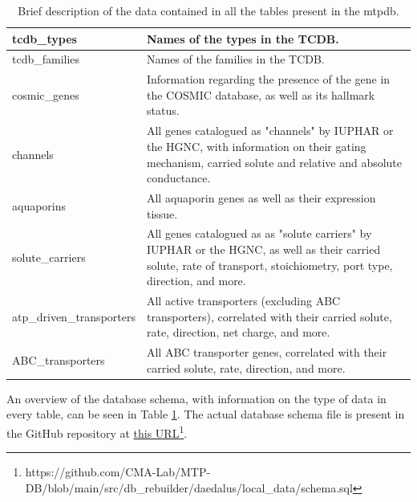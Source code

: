 \begin{table}
\begin{tabularx}{\textwidth}{|l|X|}
tcdb\_types               & Names of the types in the TCDB.                                                                                                                                     \\ \hline
tcdb\_families            & Names of the families in the TCDB.                                                                                                                                  \\ \hline
cosmic\_genes             & Information regarding the presence of the gene in the COSMIC database, as well as its hallmark status.                                                              \\ \hline
channels                  & All genes catalogued as "channels" by IUPHAR or the HGNC, with information on their gating mechanism, carried solute and relative and absolute conductance.         \\ \hline
aquaporins                & All aquaporin genes as well as their expression tissue.                                                                                                             \\ \hline
solute\_carriers          & All genes catalogued as as "solute carriers" by IUPHAR or the HGNC, as well as their carried solute, rate of transport, stoichiometry, port type, direction, and more. \\ \hline
atp\_driven\_transporters & All active transporters (excluding ABC transporters), correlated with their carried solute, rate, direction, net charge, and more.                                  \\ \hline
ABC\_transporters         & All ABC transporter genes, correlated with their carried solute, rate, direction, and more.                                                                         \\ \hline
\end{tabularx}%
\caption{Brief description of the data contained in all the tables present in the \gls{mtpdb}.}
\label{tab:databaseSchema}
\end{table}

An overview of the database schema, with information on the type of data in every table, can be seen in Table \ref{tab:databaseSchema}. The actual database schema file is present in the GitHub repository at \href{https://github.com/CMA-Lab/MTP-DB/blob/main/src/db_rebuilder/daedalus/local_data/schema.sql}{this URL}\footnote{https://github.com/CMA-Lab/MTP-DB/blob/main/src/db\_rebuilder/daedalus/local\_data/schema.sql}.

